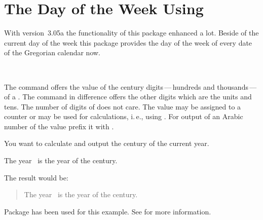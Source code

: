 
\chapter{The Day of the Week Using }

With version~3.05a the functionality of this package enhanced a lot. Beside of
the current day of the week this package provides the
day of the week of every date of the Gregorian calendar now.

\begin{Declaration}
  \\%
\end{Declaration}%
%
%
The command  offers
the value of the century digits\,---\,hundreds and thousands\,---\,of a
. The command  in difference offers the other
digits which are the units and tens. The number of digits of  does
not care. The value may be assigned to a counter or may be used for
calculations, i.\,e., using . For
output of an Arabic number of the value prefix it with
.

\begin{Example}
  You want to calculate and output the century of the current year.
\begin{lstcode}
  The year \the\year\ is the year \the\DecadePart{\year}
  of the \engord{\numexpr\CenturyPart{\year}+1\relax} century.
\end{lstcode}
  The result would be:
  \begin{quote}
    The year \the\year\ is the year \the\DecadePart{\year}
    of the \engordnumber{\numexpr\CenturyPart{\year}+1\relax} century.
  \end{quote}
  Package  has been used for this
  example. See \cite{package:engord} for more information.
\end{Example}

